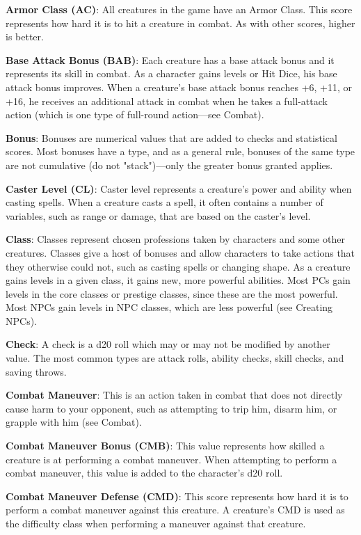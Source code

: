 \textbf{Armor Class (AC)}: All creatures in the game have an Armor Class. This score represents how hard it is to hit a creature in combat. As with other scores, higher is better.
				
\textbf{Base Attack Bonus (BAB)}: Each creature has a base attack bonus and it represents its skill in combat. As a character gains levels or Hit Dice, his base attack bonus improves. When a creature's base attack bonus reaches +6, +11, or +16, he receives an additional attack in combat when he takes a full-attack action (which is one type of full-round action---see Combat).
				
\textbf{Bonus}: Bonuses are numerical values that are added to checks and statistical scores. Most bonuses have a type, and as a general rule, bonuses of the same type are not cumulative (do not "stack")---only the greater bonus granted applies. 
				
\textbf{Caster Level (CL)}: Caster level represents a creature's power and ability when casting spells. When a creature casts a spell, it often contains a number of variables, such as range or damage, that are based on the caster's level.
				
\textbf{Class}: Classes represent chosen professions taken by characters and some other creatures. Classes give a host of bonuses and allow characters to take actions that they otherwise could not, such as casting spells or changing shape. As a creature gains levels in a given class, it gains new, more powerful abilities. Most PCs gain levels in the core classes or prestige classes, since these are the most powerful. Most NPCs gain levels in NPC classes, which are less powerful (see Creating NPCs).
				
\textbf{Check}: A check is a d20 roll which may or may not be modified by another value. The most common types are attack rolls, ability checks, skill checks, and saving throws.
				
\textbf{Combat Maneuver}: This is an action taken in combat that does not directly cause harm to your opponent, such as attempting to trip him, disarm him, or grapple with him (see Combat).
				
\textbf{Combat Maneuver Bonus (CMB)}: This value represents how skilled a creature is at performing a combat maneuver. When attempting to perform a combat maneuver, this value is added to the character's d20 roll.
				
\textbf{Combat Maneuver Defense (CMD)}: This score represents how hard it is to perform a combat maneuver against this creature. A creature's CMD is used as the difficulty class when performing a maneuver against that creature.
				
